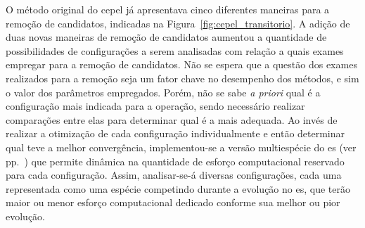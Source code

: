 O método original do \acs{cepel} já apresentava cinco diferentes
maneiras para a remoção de candidatos, indicadas na
Figura~\ref{fig:cepel_transitorio}. A adição de duas novas maneiras de
remoção de candidatos aumentou a quantidade de possibilidades de
configurações a serem analisadas com relação a quais exames empregar
para a remoção de candidatos. Não se espera que a questão dos exames
realizados para a remoção seja um fator chave no desempenho dos
métodos, e sim o valor dos parâmetros empregados. Porém, não se sabe
\emph{a priori} qual é a configuração mais indicada para a operação,
sendo necessário realizar comparações entre elas para determinar qual
é a mais adequada. Ao invés de realizar a otimização de cada
configuração individualmente e então determinar qual teve a melhor
convergência, implementou-se a versão multiespécie do \acs{es} (ver
pp.~\pageref{sssec:multiespecie}) que
permite dinâmica na quantidade de esforço computacional reservado para
cada configuração. Assim, analisar-se-á diversas configurações, cada
uma representada como uma espécie competindo durante a evolução no
\acs{es}, que terão maior ou menor esforço computacional dedicado
conforme sua melhor ou pior evolução.

